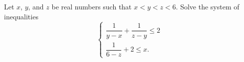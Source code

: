 \documentclass[varwidth]{standalone}
\begin{document}
    Let $x$, $y$, and $z$ be real numbers such that $x < y < z < 6$. Solve the system of inequalities
    \[
        \left\lbrace \begin{array}{c}
           \dfrac{1}{y - x} + \dfrac{1}{z - y} \leq 2 \\
           \dfrac{1}{6 - z} + 2 \leq x. 
        \end{array} \right.
    \]
\end{document}
